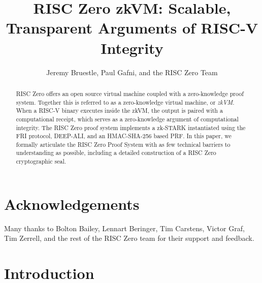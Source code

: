 \documentclass[10pt,letterpaper,titlepage]{article}
\author{Jeremy Bruestle, Paul Gafni, and the RISC Zero Team}
\title{RISC Zero zkVM: Scalable, Transparent Arguments of RISC-V Integrity}
\theoremstyle{definition}
\begin{document}
\maketitle
\begin{abstract}
RISC Zero offers an open source virtual machine coupled with a zero-knowledge proof system.
Together this is referred to as a zero-knowledge virtual machine, or \textit{zkVM}.
When a RISC-V binary executes inside the zkVM, the output is paired with a computational receipt, which serves as a zero-knowledge argument of computational integrity.
The RISC Zero proof system implements a zk-STARK instantiated using the FRI protocol, DEEP-ALI, and an HMAC-SHA-256 based PRF.
In this paper, we formally articulate the RISC Zero Proof System with as few technical barriers to understanding as possible, including a detailed construction of a RISC Zero cryptographic seal.
\end{abstract}

\tableofcontents

\section*{Acknowledgements}
Many thanks to Bolton Bailey, Lennart Beringer, Tim Carstens, Victor Graf, Tim Zerrell, and the rest of the RISC Zero team for their support and feedback.

\clearpage

\section{Introduction}
\label{introduction}
\end{document}
